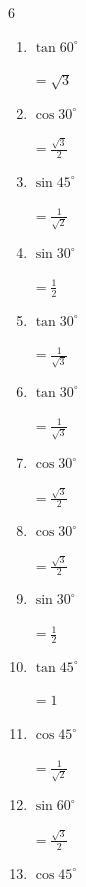 \begin{multicols}{6}
\begin{enumerate}
        $\displaystyle =1$

  \item $\displaystyle \tan{60^\circ}$

        $\displaystyle =\sqrt{3}$

  \item $\displaystyle \cos{30^\circ}$

        $\displaystyle =\frac{\sqrt{3}}{2}$

  \item $\displaystyle \sin{45^\circ}$

        $\displaystyle =\frac{1}{\sqrt{2}}$

  \item $\displaystyle \sin{30^\circ}$

        $\displaystyle =\frac{1}{2}$

  \item $\displaystyle \tan{30^\circ}$

        $\displaystyle =\frac{1}{\sqrt{3}}$

  \item $\displaystyle \tan{30^\circ}$

        $\displaystyle =\frac{1}{\sqrt{3}}$

  \item $\displaystyle \cos{30^\circ}$

        $\displaystyle =\frac{\sqrt{3}}{2}$

\columnbreak %

  \item $\displaystyle \cos{30^\circ}$

        $\displaystyle =\frac{\sqrt{3}}{2}$

  \item $\displaystyle \sin{30^\circ}$

        $\displaystyle =\frac{1}{2}$

  \item $\displaystyle \tan{45^\circ}$

        $\displaystyle =1$

  \item $\displaystyle \cos{45^\circ}$

        $\displaystyle =\frac{1}{\sqrt{2}}$

  \item $\displaystyle \sin{60^\circ}$

        $\displaystyle =\frac{\sqrt{3}}{2}$

  \item $\displaystyle \cos{45^\circ}$


\end{enumerate}
\end{multicols}
